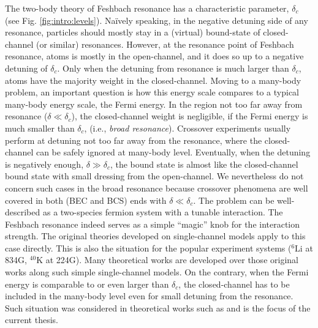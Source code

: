   The two-body theory of Feshbach resonance has a characteristic  parameter, $\delta_c$ (see Fig. \ref{fig:intro:levels}).  Na\"{i}vely speaking, in the negative detuning side of any resonance, particles should mostly stay  in a (virtual) bound-state of closed-channel (or similar) resonances.  However, at the resonance point  of Feshbach resonance, atoms is mostly in the open-channel, and it does so up to a negative detuning of $\delta_c$. Only when the detuning from resonance is much larger than $\delta_c$, atoms have the majority weight in the closed-channel.    Moving to a many-body problem, an important question is how this energy scale compares to a typical many-body energy scale, the Fermi energy. In the region not too far away from resonance ($\delta\ll\delta_{c}$), the closed-channel weight is negligible, if the Fermi energy is much smaller than $\delta_c$, (i.e., \emph{broad resonance}).  Crossover experiments usually perform at detuning not too far away from the resonance, where the closed-channel can be safely ignored at many-body level. Eventually, when the detuning is negatively enough, $\delta\gg\delta_{c}$, the bound state is almost like the closed-channel bound state with small dressing from the open-channel.  We nevertheless do not concern such cases in the broad resonance because crossover phenomena are well covered in both (BEC and BCS) ends with $\delta\ll\delta_{c}$. The problem can be well-described as a two-species fermion system with a tunable interaction.  The Feshbach resonance indeed serves as a simple ``magic'' knob for the interaction strength.  The original  theories developed on  single-channel models  apply to this case directly.  This is also the situation for the popular experiment systems (${}^{6}\text{Li}$ at 834G, $^{40}\text{K}$ at 224G).   Many theoretical works are developed over those original works along such simple single-channel models. On the contrary, when the Fermi energy is  comparable to or even larger than $\delta_c$, the closed-channel has to be included in the many-body level even for small detuning from the resonance. Such situation was considered in  theoretical works such as \cite{GurarieNarrow} and is the focus of the current thesis. 
  
